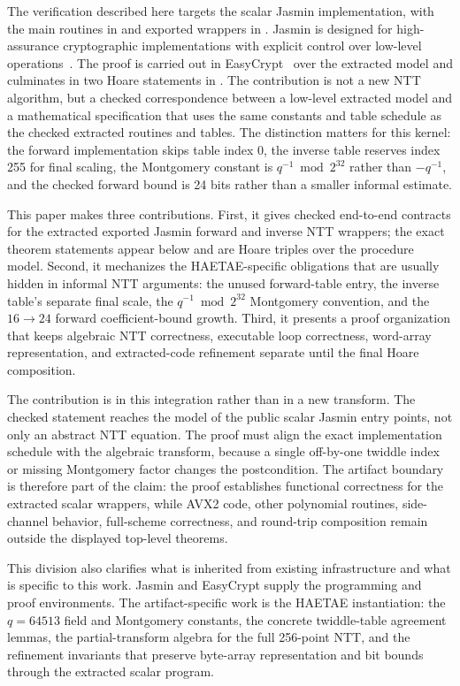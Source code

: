 \documentclass[10pt,twocolumn]{article}
\newcommand{\haetae}{HAETAE}
\newcommand{\ec}{EasyCrypt}
\newcommand{\jasmin}{Jasmin}
\begin{document}
The verification described here targets the scalar \jasmin{} implementation,
with the main routines in  and exported wrappers in
.
\jasmin{} is designed for high-assurance cryptographic implementations with
explicit control over low-level operations~\cite{Jasmin2017}. The proof is
carried out in \ec{}~\cite{EasyCrypt2013} over the extracted model and
culminates in two Hoare statements in . The
contribution is not a new NTT algorithm, but a checked correspondence between a
low-level extracted model and a mathematical specification that uses the same
constants and table schedule as the checked extracted routines and tables. The
distinction matters for this kernel: the forward implementation skips table
index 0, the inverse table reserves index 255 for final scaling, the Montgomery
constant is
\(q^{-1} \bmod 2^{32}\) rather than \(-q^{-1}\), and the checked forward bound is
24 bits rather than a smaller informal estimate.

This paper makes three contributions. First, it gives checked end-to-end
contracts for the extracted exported \jasmin{} forward and inverse NTT wrappers;
the exact theorem statements appear below and are Hoare triples over the
 procedure model. Second, it mechanizes the
\haetae{}-specific obligations that are usually hidden in informal NTT
arguments: the unused forward-table entry, the inverse table's separate final
scale, the \(q^{-1} \bmod 2^{32}\) Montgomery convention, and the \(16\to24\)
forward coefficient-bound growth. Third, it presents a proof organization that
keeps algebraic NTT correctness, executable loop correctness, word-array
representation, and extracted-code refinement separate until the final Hoare
composition.

The contribution is in this integration rather than in a new transform. The
checked statement reaches the  model of the public scalar
\jasmin{} entry points, not only an abstract NTT equation. The proof must align
the exact implementation schedule with the algebraic transform, because a
single off-by-one twiddle index or missing Montgomery factor changes the
postcondition. The artifact boundary is therefore part of the claim: the proof
establishes functional correctness for the extracted scalar wrappers, while
AVX2 code, other polynomial routines, side-channel behavior, full-scheme
correctness, and round-trip composition remain outside the displayed top-level
theorems.

This division also clarifies what is inherited from existing infrastructure and
what is specific to this work. \jasmin{} and \ec{} supply the programming and
proof environments. The artifact-specific work is the HAETAE instantiation:
the \(q=64513\) field and Montgomery constants, the concrete twiddle-table
agreement lemmas, the partial-transform algebra for the full 256-point NTT, and
the refinement invariants that preserve byte-array representation and bit
bounds through the extracted scalar program.
\end{document}

